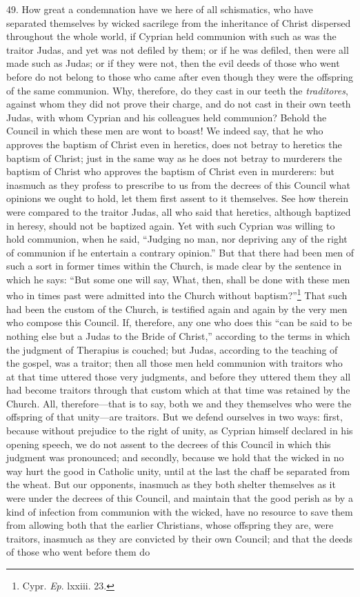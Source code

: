 49. How great a condemnation have we here of all schismatics, who have separated themselves by wicked sacrilege from the inheritance of Christ dispersed throughout the whole world, if Cyprian held communion with such as was the traitor Judas, and yet was not defiled by them; or if he was defiled, then were all made such as Judas; or if they were not, then the evil deeds of those who went before do not belong to those who came after even though they were the offspring of the same communion. Why, therefore, do they cast in our teeth the \emph{traditores}, against whom they did not prove their charge, and do not cast in their own teeth Judas, with whom Cyprian and his colleagues held communion? Behold the Council in which these men are wont to boast! We indeed say, that he who approves the baptism of Christ even in heretics, does not betray to heretics the baptism of Christ; just in the same way as he does not betray to murderers the baptism of Christ who approves the baptism of Christ even in murderers: but inasmuch as they profess to prescribe to us from the decrees of this Council what opinions we ought to hold, let them first assent to it themselves. See how therein were compared to the traitor Judas, all who said that heretics, although baptized in heresy, should not be baptized again. Yet with such Cyprian was willing to hold communion, when he said, ``Judging no man, nor depriving any of the right of communion if he entertain a contrary opinion.'' But that there had been men of such a sort in former times within the Church, is made clear by the sentence in which he says: ``But some one will say, What, then, shall be done with these men who in times past were admitted into the Church without baptism?''\footnote{\par  Cypr. \emph{Ep}. lxxiii. 23.} That such had been the custom of the Church, is testified again and again by the very men who compose this Council. If, therefore, any one who does this ``can be said to be nothing else but a Judas to the Bride of Christ,'' according to the terms in which the judgment of Therapius is couched; but Judas, according to the teaching of the gospel, was a traitor; then all those men held communion with traitors who at that time uttered those very judgments, and before they uttered them they all had become traitors through that custom which at that time was retained by the Church. All, therefore—that is to say, both we and they themselves who were the offspring of that unity—are traitors. But we defend ourselves in two ways: first, because without prejudice to the right of unity, as Cyprian himself declared in his opening speech, we do not assent to the decrees of this Council in which this judgment was pronounced; and secondly, because we hold that the wicked in no way hurt the good in Catholic unity, until at the last the chaff be separated from the wheat. But our opponents, inasmuch as they both shelter themselves as it were under the decrees of this Council, and maintain that the good perish as by a kind of infection from communion with the wicked, have no resource to save them from allowing both that the earlier Christians, whose offspring they are, were traitors, inasmuch as they are convicted by their own Council; and that the deeds of those who went before them do 